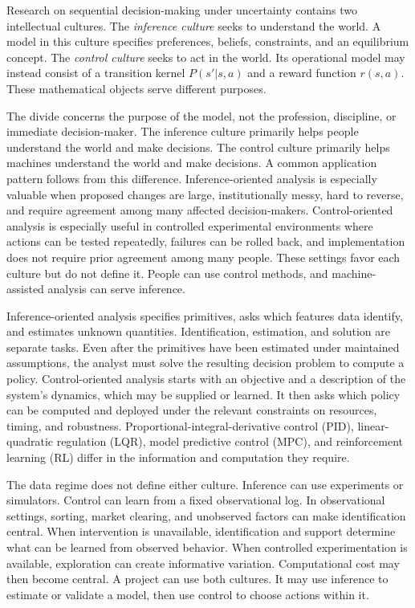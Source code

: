 Research on sequential decision-making under uncertainty contains two intellectual cultures. The \emph{inference culture} seeks to understand the world. A model in this culture specifies preferences, beliefs, constraints, and an equilibrium concept. The \emph{control culture} seeks to act in the world. Its operational model may instead consist of a transition kernel $P(s'|s,a)$ and a reward function $r(s,a)$. These mathematical objects serve different purposes.

The divide concerns the purpose of the model, not the profession, discipline, or immediate decision-maker. The inference culture primarily helps people understand the world and make decisions. The control culture primarily helps machines understand the world and make decisions. A common application pattern follows from this difference. Inference-oriented analysis is especially valuable when proposed changes are large, institutionally messy, hard to reverse, and require agreement among many affected decision-makers. Control-oriented analysis is especially useful in controlled experimental environments where actions can be tested repeatedly, failures can be rolled back, and implementation does not require prior agreement among many people. These settings favor each culture but do not define it. People can use control methods, and machine-assisted analysis can serve inference.

Inference-oriented analysis specifies primitives, asks which features data identify, and estimates unknown quantities. Identification, estimation, and solution are separate tasks. Even after the primitives have been estimated under maintained assumptions, the analyst must solve the resulting decision problem to compute a policy. Control-oriented analysis starts with an objective and a description of the system's dynamics, which may be supplied or learned. It then asks which policy can be computed and deployed under the relevant constraints on resources, timing, and robustness. Proportional-integral-derivative control (PID), linear-quadratic regulation (LQR), model predictive control (MPC), and reinforcement learning (RL) differ in the information and computation they require.

The data regime does not define either culture. Inference can use experiments or simulators. Control can learn from a fixed observational log. In observational settings, sorting, market clearing, and unobserved factors can make identification central. When intervention is unavailable, identification and support determine what can be learned from observed behavior. When controlled experimentation is available, exploration can create informative variation. Computational cost may then become central. A project can use both cultures. It may use inference to estimate or validate a model, then use control to choose actions within it.


